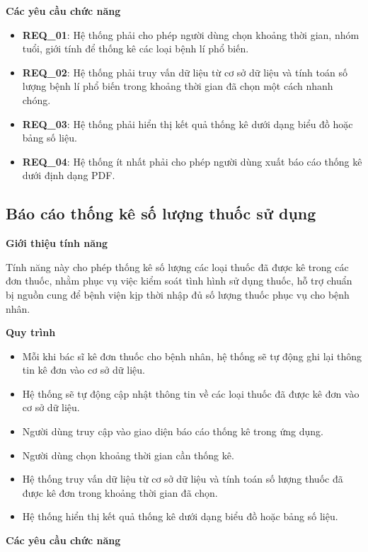 \noindent \textbf{Các yêu cầu chức năng}

\begin{itemize}
    \item \textbf{REQ\_01}: Hệ thống phải cho phép người dùng chọn khoảng thời gian, nhóm tuổi, giới tính để thống kê các loại bệnh lí phổ biến.
    \item \textbf{REQ\_02}: Hệ thống phải truy vấn dữ liệu từ cơ sở dữ liệu và tính toán số lượng bệnh lí phổ biến trong khoảng thời gian đã chọn một cách nhanh chóng.
    \item \textbf{REQ\_03}: Hệ thống phải hiển thị kết quả thống kê dưới dạng biểu đồ hoặc bảng số liệu.
    \item \textbf{REQ\_04}: Hệ thống ít nhất phải cho phép người dùng xuất báo cáo thống kê dưới định dạng PDF.
\end{itemize}

\subsection{Báo cáo thống kê số lượng thuốc sử dụng}

\noindent \textbf{Giới thiệu tính năng}

Tính năng này cho phép thống kê số lượng các loại thuốc đã được kê trong các đơn thuốc, nhằm phục vụ việc kiểm soát tình hình sử dụng thuốc, hỗ trợ chuẩn bị nguồn cung để bệnh viện kịp thời nhập đủ số lượng thuốc phục vụ cho bệnh nhân.

\noindent \textbf{Quy trình}

\begin{itemize}
    \item Mỗi khi bác sĩ kê đơn thuốc cho bệnh nhân, hệ thống sẽ tự động ghi lại thông tin kê đơn vào cơ sở dữ liệu.
    \item Hệ thống sẽ tự động cập nhật thông tin về các loại thuốc đã được kê đơn vào cơ sở dữ liệu.
    \item Người dùng truy cập vào giao diện báo cáo thống kê trong ứng dụng.
    \item Người dùng chọn khoảng thời gian cần thống kê.
    \item Hệ thống truy vấn dữ liệu từ cơ sở dữ liệu và tính toán số lượng thuốc đã được kê đơn trong khoảng thời gian đã chọn.
    \item Hệ thống hiển thị kết quả thống kê dưới dạng biểu đồ hoặc bảng số liệu.
\end{itemize}

\noindent \textbf{Các yêu cầu chức năng}

